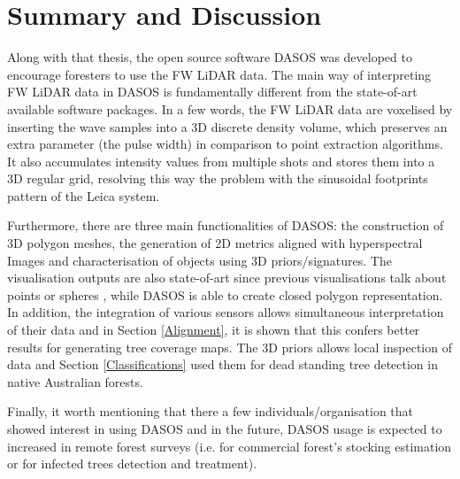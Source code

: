 \documentclass{subfiles}
\begin{document}
	  \section{Summary and Discussion} \label{DASOS-Vol-Summary}
	  
	   	Along with that thesis, the open source software DASOS was developed to encourage foresters to use the FW LiDAR data. The main way of interpreting FW LiDAR data in DASOS is fundamentally different from the state-of-art available software packages. In a few words, the FW LiDAR data are voxelised by inserting the wave samples into a 3D discrete density volume, which preserves an extra parameter (the pulse width) in comparison to point extraction algorithms. It also accumulates intensity values from multiple shots and stores them into a 3D regular grid, resolving this way the problem with the sinusoidal footprints pattern of the Leica system.
	   	
	   	Furthermore, there are three main functionalities of DASOS: the construction of 3D polygon meshes, the generation of 2D metrics aligned with hyperspectral Images and characterisation of objects using 3D priors/signatures. The visualisation outputs are also state-of-art since previous visualisations talk about points \cite{Bunting2013} or spheres \cite{Chauve2009}, while DASOS is able to create closed polygon representation. In addition, the integration of various sensors allows simultaneous interpretation of their data and in Section \ref{Alignment}, it is shown that this confers better results for generating tree coverage maps. The 3D priors allows local inspection of data and Section \ref{Classifications} used them for dead standing tree detection in native Australian forests.
	   		
	   	Finally, it worth mentioning that there a few individuals/organisation that showed interest in using DASOS and in the future, DASOS usage is expected to increased in remote forest surveys (i.e. for commercial forest’s stocking estimation or for infected trees detection and treatment).
	   	
	   	
\end{document}
